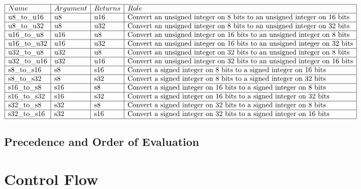 \documentclass{scrartcl}
\begin{document}
$\begin{array}{|l|l|l|l|}
\hline
Name & Argument & Returns & Role\\
\hline
\text{u8\_to\_u16} & \text{u8} & \text{u16} & \text{Convert an unsigned integer on 8 bits to an unsigned integer on 16 bits}\\
\hline
\text{u8\_to\_u32} & \text{u8} & \text{u32} & \text{Convert an unsigned integer on 8 bits to an unsigned integer on 32 bits}\\
\hline
\text{u16\_to\_u8} & \text{u16} & \text{u8} & \text{Convert an unsigned integer on 16 bits to an unsigned integer on 8 bits}\\
\hline
\text{u16\_to\_u32} & \text{u16} & \text{u32} & \text{Convert an unsigned integer on 16 bits to an unsigned integer on 32 bits}\\
\hline
\text{u32\_to\_u8} & \text{u32} & \text{u8} & \text{Convert an unsigned integer on 32 bits to an unsigned integer on 8 bits}\\
\hline
\text{u32\_to\_u16} & \text{u32} & \text{u16} & \text{Convert an unsigned integer on 32 bits to an unsigned integer on 16 bits}\\
\hline
\text{s8\_to\_s16} & \text{s8} & \text{s16} & \text{Convert a signed integer on 8 bits to a signed integer on 16 bits}\\
\hline
\text{s8\_to\_s32} & \text{s8} & \text{s32} & \text{Convert a signed integer on 8 bits to a signed integer on 32 bits}\\
\hline
\text{s16\_to\_s8} & \text{s16} & \text{s8} & \text{Convert a signed integer on 16 bits to a signed integer on 8 bits}\\
\hline
\text{s16\_to\_s32} & \text{s16} & \text{s32} & \text{Convert a signed integer on 16 bits to a signed integer on 32 bits}\\
\hline
\text{s32\_to\_s8} & \text{s32} & \text{s8} & \text{Convert a signed integer on 32 bits to a signed integer on 8 bits}\\
\hline
\text{s32\_to\_s16} & \text{s32} & \text{s16} & \text{Convert a signed integer on 32 bits to a signed integer on 16 bits}\\
\hline
\end{array}$
        \subsection{Precedence and Order of Evaluation}
    \section{Control Flow}
\end{document}
